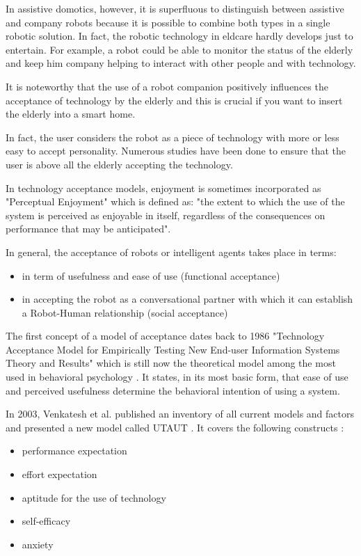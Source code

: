 \documentclass{thesisreport}
\begin{document}
 In assistive domotics, however, it is superfluous to distinguish between assistive and company robots because it is possible to combine both types in a single robotic solution. In fact, the robotic technology in eldcare hardly develops just to entertain.
 For example, a robot could be able to monitor the status of the elderly and keep him company helping to interact with other people and with technology.
 
 It is noteworthy that the use of a robot companion positively influences the acceptance of technology by the elderly and this is crucial if you want to insert the elderly into a smart home.
 
 In fact, the user considers the robot as a piece of technology with more or less easy to accept personality.
 Numerous studies have been done to ensure that the user is above all the elderly accepting the technology.
 
 In technology acceptance models, enjoyment is sometimes incorporated as "Perceptual Enjoyment" which is defined as: "the extent to which the use of the system is perceived as enjoyable in itself, regardless of the consequences on performance that may be anticipated".
 
 In general, the acceptance of robots or intelligent agents takes place in terms:
 \begin{itemize}
     \item in term of usefulness and ease of use (functional acceptance)
     \item in accepting the robot as a conversational partner with which it can establish a Robot-Human relationship (social acceptance)
 \end{itemize}
 
 The first concept of a model of acceptance dates back to 1986 "Technology Acceptance Model for Empirically Testing New End-user Information Systems Theory and Results" which is still now the theoretical model among the most used in behavioral psychology \cite{davis1985technology,enjoymentModels}.
 It states, in its most basic form, that ease of use and perceived usefulness determine the behavioral intention of using a system.
 
 In 2003, Venkatesh et al. published an inventory of all current models and factors and presented a new model called UTAUT \cite{venkatesh2003user,enjoymentModels}. It covers the following constructs :
 \begin{itemize}
     \item performance expectation
     \item effort expectation
     \item aptitude for the use of technology
     \item self-efficacy
     \item anxiety
 \end{itemize}
 
\end{document}
